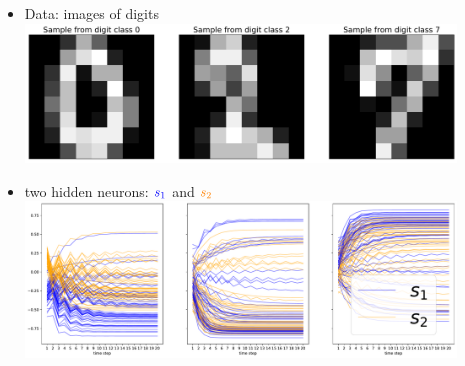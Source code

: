 \begin{frame}{\subsecname}




\begin{minipage}{\textwidth}

    \begin{minipage}{0.59\textwidth}
    \begin{itemize}
        \item Data: images of digits\\
        
            \includegraphics[width=0.9\textwidth]{img/echo_sample_images}
        
        \item two hidden neurons: ${\color{blue}s_1}$ and ${\color{orange}s_2}$\\
        
            \includegraphics[width=0.9\textwidth]{img/echo_hidden_vs_time}
    \end{itemize}
        

\end{minipage}
\end{minipage}
\end{frame}
